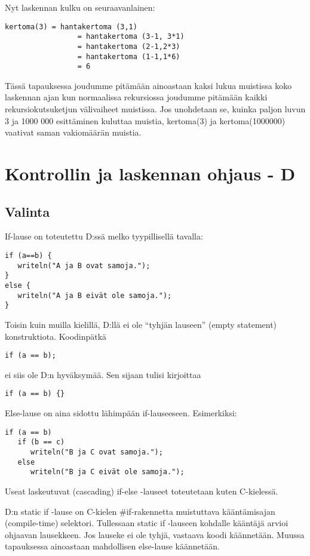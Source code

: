 \documentclass[11pt,oneside,a4paper]{article}
\begin{document}
Nyt laskennan kulku on seuraavanlainen: 
\begin{verbatim}
kertoma(3) = hantakertoma (3,1)
                 = hantakertoma (3-1, 3*1)		
                 = hantakertoma (2-1,2*3)
                 = hantakertoma (1-1,1*6)
                 = 6
\end{verbatim}
Tässä tapauksessa joudumme pitämään ainoastaan kaksi lukua muistissa koko
laskennan ajan kun normaalissa rekursiossa joudumme pitämään kaikki
rekursiokutsuketjun välivaiheet muistissa. Jos unohdetaan se, kuinka paljon
luvun 3 ja 1000 000 esittäminen kuluttaa muistia, kertoma(3) ja kertoma(1000000)
vaativat saman vakiomäärän muistia. 

\section{Kontrollin ja laskennan ohjaus - D}

\subsection{Valinta}

If-lause on toteutettu D:ssä melko tyypillisellä tavalla:

\begin{verbatim}
if (a==b) {
   writeln("A ja B ovat samoja.");
}
else {
   writeln("A ja B eivät ole samoja.");
}
\end{verbatim}
Toisin kuin muilla kielillä, D:llä ei ole ``tyhjän lauseen'' (empty statement)
konstruktiota. Koodinpätkä

\begin{verbatim}
if (a == b);
\end{verbatim}
ei siis ole D:n hyväksymää. Sen sijaan tulisi kirjoittaa

\begin{verbatim}
if (a == b) {}
\end{verbatim}
Else-lause on aina sidottu lähimpään if-lauseeseen. Esimerkiksi:

\begin{verbatim}
if (a == b)
   if (b == c)
      writeln("B ja C ovat samoja.");
   else
      writeln("B ja C eivät ole samoja.");
\end{verbatim}
Useat laskeutuvat (cascading) if-else -lauseet toteutetaan kuten C-kielessä.

D:n static if -lause on C-kielen \#if-rakennetta muistuttava kääntämisajan
(compile-time) selektori. Tullessaan static if -lauseen kohdalle kääntäjä arvioi
ohjaavan lausekkeen. Jos lauseke ei ole tyhjä, vastaava koodi käännetään. Muussa
tapauksessa ainoastaan mahdollisen else-lause käännetään. 
\end{document}
